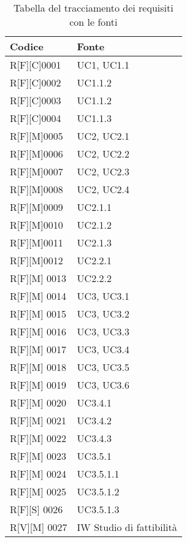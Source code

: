 \begin{table}%
    \caption{Tabella del tracciamento dei requisiti con le fonti}
    \label{tab:requisiti-fonte}
    \begin{tabularx}{\textwidth}{lX}
    \hline\hline
    \textbf{Codice}  & \textbf{Fonte}\\
    \hline
    R[F][C]0001    & UC1, UC1.1  \\
    \hline
    R[F][C]0002   & UC1.1.2  \\
    \hline
    R[F][C]0003    & UC1.1.2  \\
    \hline
    R[F][C]0004    & UC1.1.3  \\
    \hline
    R[F][M]0005    & UC2, UC2.1  \\
    \hline
    R[F][M]0006    & UC2, UC2.2  \\
    \hline
    R[F][M]0007    & UC2, UC2.3  \\
    \hline
    R[F][M]0008    & UC2, UC2.4  \\
    \hline
    R[F][M]0009    & UC2.1.1  \\
    \hline
    R[F][M]0010    & UC2.1.2  \\
    \hline
    R[F][M]0011    & UC2.1.3  \\
    \hline
    R[F][M]0012    & UC2.2.1  \\
    \hline
    R[F][M] 0013    & UC2.2.2  \\
    \hline
    R[F][M] 0014    & UC3, UC3.1  \\
    \hline
    R[F][M] 0015    & UC3, UC3.2  \\
    \hline
    R[F][M] 0016    & UC3, UC3.3  \\
    \hline
    R[F][M] 0017    & UC3, UC3.4  \\
    \hline
    R[F][M] 0018    & UC3, UC3.5  \\
    \hline
    R[F][M] 0019    & UC3, UC3.6  \\
    \hline
    R[F][M] 0020    & UC3.4.1  \\
    \hline
    R[F][M] 0021    & UC3.4.2  \\
    \hline
    R[F][M] 0022    & UC3.4.3  \\
    \hline
    R[F][M] 0023    & UC3.5.1  \\
    \hline
    R[F][M] 0024    & UC3.5.1.1  \\
    \hline
    R[F][M] 0025    & UC3.5.1.2  \\
    \hline
    R[F][S] 0026    & UC3.5.1.3  \\
    \hline
    R[V][M] 0027    & IW Studio di fattibilità  \\

\end{tabularx}
\end{table}
